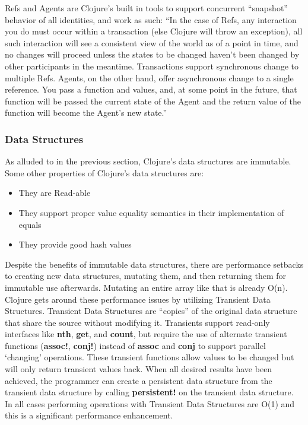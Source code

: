     Refs and Agents are Clojure's built in tools to support concurrent ``snapshot'' behavior of all identities, and work as such: ``In the case of Refs, any interaction you do must occur within a transaction (else Clojure will throw an exception), all such interaction will see a consistent view of the world as of a point in time, and no changes will proceed unless the states to be changed haven’t been changed by other participants in the meantime. Transactions support synchronous change to multiple Refs. Agents, on the other hand, offer asynchronous change to a single reference. You pass a function and values, and, at some point in the future, that function will be passed the current state of the Agent and the return value of the function will become the Agent’s new state.'' \cite{website:clojure-concurrency}
    
    

\subsubsection{Data Structures}
    
    As alluded to in the previous section, Clojure's data structures are immutable. Some other properties of Clojure's data structures are:
    \begin{itemize}
        \item They are Read-able
        \item They support proper value equality semantics in their implementation of equals
        \item They provide good hash values
    \end{itemize}
    \cite{website:clojure-lang-reference} Despite the benefits of immutable data structures, there are performance setbacks to creating new data structures, mutating them, and then returning them for immutable use afterwards. Mutating an entire array like that is already O(n). Clojure gets around these performance issues by utilizing Transient Data Structures. Transient Data Structures are ``copies'' of the original data structure that share the source without modifying it. Transients support read-only interfaces like \textbf{nth}, \textbf{get}, and \textbf{count}, but require the use of alternate transient functions (\textbf{assoc!}, \textbf{conj!}) instead of \textbf{assoc} and \textbf{conj} to support parallel `changing' operations. These transient functions allow values to be changed but will only return transient values back. When all desired results have been achieved, the programmer can create a persistent data structure from the transient data structure by calling \textbf{persistent!} on the transient data structure. In all cases performing operations with Transient Data Structures are O(1) and this is a significant performance enhancement.
    
